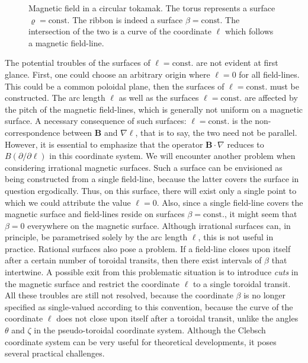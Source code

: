 \begin{figure}[H]
    \centering
    \scalebox{1}{}
    \captionsetup{justification=centering}
    \caption{Magnetic field in a circular tokamak. The torus represents a surface $\varrho=\text{const.}$ The ribbon is indeed a surface $\beta=\text{const.}$ The intersection of the two is a curve of the coordinate $\ell$ which follows a magnetic field-line.}
    \label{fig5-3}
\end{figure}

The potential troubles of the surfaces of $\ell=\text{const.}$ are not evident at first glance. First, one could choose an arbitrary origin where $\ell=0$ for all field-lines. This could be a common poloidal plane, then the surfaces of $\ell=\text{const.}$ must be constructed. The arc length $\ell$ as well as the surfaces $\ell=\text{const.}$ are affected by the pitch of the magnetic field-lines, which is generally not uniform on a magnetic surface. A necessary consequence of such surfaces: $\ell=\text{const.}$ is the non-correspondence between $\mathbf{B}$ and $\nabla\ell$, that is to say, the two need not be parallel. However, it is essential to emphasize that the operator $\mathbf{B}\cdot\nabla$ reduces to $B(\partial/\partial\ell)$ in this coordinate system. We will encounter another problem when considering irrational magnetic surfaces. Such a surface can be envisioned as being constructed from a single field-line, because the latter covers the surface in question ergodically. Thus, on this surface, there will exist only a single point to which we could attribute the value $\ell=0$. Also, since a single field-line covers the magnetic surface and field-lines reside on surfaces $\beta=\text{const.}$, it might seem that $\beta=0$ everywhere on the magnetic surface. Although irrational surfaces can, in principle, be parametrised solely by the arc length $\ell$, this is not useful in practice. Rational surfaces also pose a problem. If a field-line closes upon itself after a certain number of toroidal transits, then there exist intervals of $\beta$ that intertwine. A possible exit from this problematic situation is to introduce \textit{cuts} in the magnetic surface and restrict the coordinate $\ell$ to a single toroidal transit. All these troubles are still not resolved, because the coordinate $\beta$ is no longer specified as single-valued according to this convention, because the curve of the coordinate $\ell$ does not close upon itself after a toroidal transit, unlike the angles $\theta$ and $\zeta$ in the pseudo-toroidal coordinate system. Although the Clebsch coordinate system can be very useful for theoretical developments, it poses several practical challenges.

